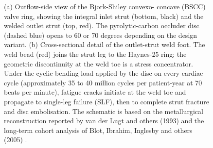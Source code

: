 \begin{figure}[htbp]
\caption[Bjork-Shiley convexo-concave outlet strut and weld-toe
fatigue]{(a) Outflow-side view of the Bjork-Shiley convexo-
concave (BSCC) valve ring, showing the integral inlet strut
(bottom, black) and the welded outlet strut (top, red). The
pyrolytic-carbon occluder disc (dashed blue) opens to 60 or 70
degrees depending on the design variant. (b) Cross-sectional
detail of the outlet-strut weld foot. The weld bead (red) joins
the strut leg to the Haynes-25 ring; the geometric discontinuity
at the weld toe is a stress concentrator. Under the cyclic
bending load applied by the disc on every cardiac cycle
(approximately 35 to 40 million cycles per patient-year at 70
beats per minute), fatigue cracks initiate at the weld toe and
propagate to single-leg failure (SLF), then to complete strut
fracture and disc embolisation. The schematic is based on the
metallurgical reconstruction reported by van der Lugt and
others (1993) and the long-term cohort analysis of Blot,
Ibrahim, Inglesby and others (2005)
\cite{paper:v6c12-vanderlugt-strut-fracture-1993,
paper:v6c12-blot-bjork-shiley-2005,
paper:v6c12-paris-erdogan-1963}.}
\label{fig:vol06:ch12:bjork-shiley-strut}
\end{figure}
